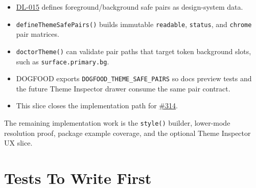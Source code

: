 \begin{itemize}
\tightlist
\item
  \href{https://github.com/flyingrobots/bijou/blob/cbd70612140e7a450d764b3c7be1c6af878b99bc/docs/design/DL-015-theme-safe-pairs-and-contrast-matrices.md}{DL-015} defines foreground/background safe pairs as design-system data.
\item
  \texttt{d\allowbreak{}e\allowbreak{}f\allowbreak{}i\allowbreak{}n\allowbreak{}e\allowbreak{}T\allowbreak{}h\allowbreak{}e\allowbreak{}m\allowbreak{}e\allowbreak{}S\allowbreak{}a\allowbreak{}f\allowbreak{}e\allowbreak{}P\allowbreak{}a\allowbreak{}i\allowbreak{}r\allowbreak{}s\allowbreak{}(\allowbreak{})} builds immutable \texttt{r\allowbreak{}e\allowbreak{}a\allowbreak{}d\allowbreak{}a\allowbreak{}b\allowbreak{}l\allowbreak{}e}, \texttt{s\allowbreak{}t\allowbreak{}a\allowbreak{}t\allowbreak{}u\allowbreak{}s}, and \texttt{c\allowbreak{}h\allowbreak{}r\allowbreak{}o\allowbreak{}m\allowbreak{}e} pair matrices.
\item
  \texttt{d\allowbreak{}o\allowbreak{}c\allowbreak{}t\allowbreak{}o\allowbreak{}r\allowbreak{}T\allowbreak{}h\allowbreak{}e\allowbreak{}m\allowbreak{}e\allowbreak{}(\allowbreak{})} can validate pair paths that target token background slots, such as \texttt{s\allowbreak{}u\allowbreak{}r\allowbreak{}f\allowbreak{}a\allowbreak{}c\allowbreak{}e\allowbreak{}.\allowbreak{}p\allowbreak{}r\allowbreak{}i\allowbreak{}m\allowbreak{}a\allowbreak{}r\allowbreak{}y\allowbreak{}.\allowbreak{}b\allowbreak{}g}.
\item
  DOGFOOD exports \texttt{D\allowbreak{}O\allowbreak{}G\allowbreak{}F\allowbreak{}O\allowbreak{}O\allowbreak{}D\allowbreak{}\_\allowbreak{}T\allowbreak{}H\allowbreak{}E\allowbreak{}M\allowbreak{}E\allowbreak{}\_\allowbreak{}S\allowbreak{}A\allowbreak{}F\allowbreak{}E\allowbreak{}\_\allowbreak{}P\allowbreak{}A\allowbreak{}I\allowbreak{}R\allowbreak{}S} so docs preview tests and the future Theme Inspector drawer consume the same pair contract.
\item
  This slice closes the implementation path for \href{https://github.com/flyingrobots/bijou/issues/314}{\#314}.
\end{itemize}

The remaining implementation work is the \texttt{s\allowbreak{}t\allowbreak{}y\allowbreak{}l\allowbreak{}e\allowbreak{}(\allowbreak{})} builder, lower-mode resolution proof, package example coverage, and the optional Theme Inspector UX slice.

\section{Tests To Write First}\label{record-178-tests-to-write-first}

